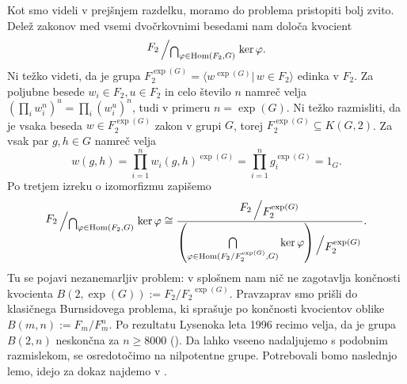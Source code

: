 Kot smo videli v prejšnjem razdelku, moramo do problema pristopiti bolj zvito. Delež zakonov med vsemi dvočrkovnimi besedami nam določa kvocient \begin{equation*}
\bigslant{F_2}{\bigcap_{\varphi \in \operatorname{Hom}(F_2, G)}} \operatorname{ker} \varphi.  
\end{equation*}  
Ni težko videti, da je grupa $F_2^{\exp(G)} =  \langle w^{\exp(G)}  \vert \, w \in F_2 \rangle$ edinka v $F_2$. Za poljubne besede $w_i \in F_2, u \in  F_2$ in celo število $n$ namreč velja $(\prod_{i} w_i^n)^u = \prod_{i} (w_i^u)^n$,
tudi v primeru $n = \exp(G)$.
Ni težko razmisliti, da je vsaka beseda $w \in  F_2^{\exp(G)}$ zakon v grupi $G$, torej $F_2^{\exp(G)} \subseteq K(G, 2)$. Za vsak par $g, h \in G$ namreč velja \begin{equation*}
w(g, h) =  \prod_{i = 1}^{n} w_i(g,h)^{\exp(G)} = \prod_{i = 1}^{n} g_i^{\exp(G)} = 1_G.
\end{equation*}  
Po tretjem izreku o izomorfizmu zapišemo
\begin{equation*}
    \bigslant{F_2}{\bigcap_{\varphi \in \operatorname{Hom}(F_2, G)}} \operatorname{ker} \varphi \cong \dfrac{\bigslant{F_2}{F_2^{\exp(G)}}}{\bigslant{ \left( \bigcap\limits_{\varphi \in \operatorname{Hom}({F_2} / {F_2^{\exp(G)}}, G)} \ker \varphi \right) }{F_2^{\exp(G)}}}.
\end{equation*}  
Tu se pojavi nezanemarljiv problem: v splošnem nam nič ne zagotavlja končnosti kvocienta $B(2, \exp(G)) := F_2 / {F_2}^{\exp(G)}$. 
Pravzaprav smo prišli do klasičnega Burnsidovega problema, ki sprašuje po končnosti kvocientov oblike $B(m, n) := F_m / F_m^n$.
Po rezultatu Lysenoka leta 1996 recimo velja, da je grupa $B(2, n)$ neskončna za $n \ge 8000$ (\cite[str.~2]{Vaughan-Lee_1999}). 
Da lahko vseeno nadaljujemo s podobnim razmislekom, se osredotočimo na nilpotentne grupe. 
Potrebovali bomo naslednjo lemo, idejo za dokaz najdemo v \cite[str.~13--14]{Segal_1983}.

